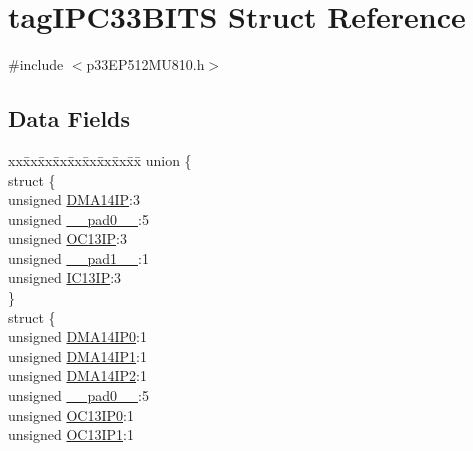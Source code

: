 \hypertarget{structtag_i_p_c33_b_i_t_s}{}\section{tag\+I\+P\+C33\+B\+I\+TS Struct Reference}
\label{structtag_i_p_c33_b_i_t_s}


{\ttfamily \#include $<$p33\+E\+P512\+M\+U810.\+h$>$}

\subsection*{Data Fields}
\begin{DoxyCompactItemize}
\item 
\begin{tabbing}
xx\=xx\=xx\=xx\=xx\=xx\=xx\=xx\=xx\=\kill
union \{\\
\>struct \{\\
\>\>unsigned \hyperlink{structtag_i_p_c33_b_i_t_s_a356589286aa6756285530e1068c71381}{DMA14IP}:3\\
\>\>unsigned \hyperlink{structtag_i_p_c33_b_i_t_s_adf71f3d8410c1f1dbbc96680a92c49af}{\_\_pad0\_\_}:5\\
\>\>unsigned \hyperlink{structtag_i_p_c33_b_i_t_s_a1b149c4d73332953990b1dfb0619ddc1}{OC13IP}:3\\
\>\>unsigned \hyperlink{structtag_i_p_c33_b_i_t_s_acaf2d0924a107ec6e8d2e31febaf66f9}{\_\_pad1\_\_}:1\\
\>\>unsigned \hyperlink{structtag_i_p_c33_b_i_t_s_ae0894e2970ccc3d80b5ab47d19cb2d2a}{IC13IP}:3\\
\>\} \\
\>struct \{\\
\>\>unsigned \hyperlink{structtag_i_p_c33_b_i_t_s_a6fe309127f2c84693aa76d3e65b786c1}{DMA14IP0}:1\\
\>\>unsigned \hyperlink{structtag_i_p_c33_b_i_t_s_aa10599f0da290aae3490ed6d92f4ac94}{DMA14IP1}:1\\
\>\>unsigned \hyperlink{structtag_i_p_c33_b_i_t_s_ab8d00baab789c2d050cec5ae166f4ca6}{DMA14IP2}:1\\
\>\>unsigned \hyperlink{structtag_i_p_c33_b_i_t_s_adf71f3d8410c1f1dbbc96680a92c49af}{\_\_pad0\_\_}:5\\
\>\>unsigned \hyperlink{structtag_i_p_c33_b_i_t_s_a24b88f7040e1f541d8ab7c1e74b3d04e}{OC13IP0}:1\\
\>\>unsigned \hyperlink{structtag_i_p_c33_b_i_t_s_abcffe8f01d0f24770796ab9dc97f37a2}{OC13IP1}:1\\

\end{tabbing}
\end{DoxyCompactItemize}
